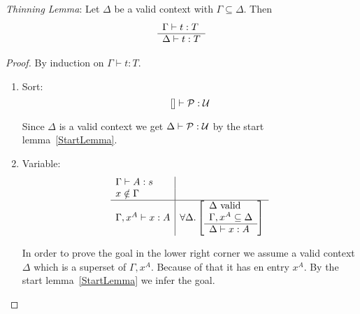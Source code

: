 \begin{theorem}
    \label{ThinningLemma}
    \emph{Thinning Lemma}: Let $\Delta$ be a valid context with $\Gamma
    \subseteq \Delta$. Then
    $$
    \begin{array}{l} 
        \Gamma \vdash t : T
     \\ \hline 
        \Delta \vdash t : T
    \end{array}
    $$
    \begin{proof}
        By induction on $\Gamma \vdash t : T$.

        \begin{enumerate}
        \item Sort:
            $$ [] \vdash {\cal P} : {\cal U}$$

            Since $\Delta$ is a valid context we get $\Delta \vdash {\cal P} :
                {\cal U}$ by the start lemma~\ref{StartLemma}.

        \item Variable:
            $$
            \begin{array}{l|l}
            \Gamma \vdash A : s
            \\
            x \notin \Gamma
            \\
            \hline
            \Gamma, x^A \vdash x : A
            &
            \forall \Delta
                . \left[\begin{array}{l} 
                    \Delta \text{ valid}
                    \\
                    \Gamma,x^A \subseteq \Delta
                 \\ \hline 
                    \Delta \vdash x: A
                \end{array}\right]
            \end{array}
            $$

            In order to prove the goal in the lower right corner we assume a
                valid context $\Delta$ which is a superset of $\Gamma,x^A$.
                Because of that it has en entry $x^A$. By the start
                lemma~\ref{StartLemma} we infer the goal.


\end{enumerate}
\end{proof}
\end{theorem}
